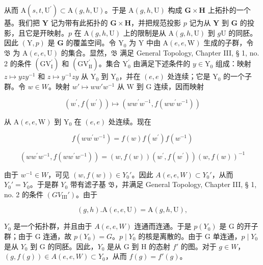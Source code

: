 从而 \(\mathrm{A}(s,t,\mathrm{U}^{\prime})\subset \mathrm{A}(g,h,\mathrm{U})\)。于是 \(\mathrm{A}(g,h,\mathrm{U})\) 构成 \(\mathbf{G}\times \mathbf{H}\) 上拓扑的一个基。我们把 \(\mathbf{Y}\) 记为带有此拓扑的 \(\mathbf{G}\times \mathbf{H}\)，并把规范投影 \(p\) 记为从 \(\mathbf{Y}\) 到 \(\mathbf{G}\) 的投影，且它是开映射。\(p\) 在 \(\mathrm{A}(g,h,\mathrm{U})\) 上的限制是从 \(\mathrm{A}(g,h,\mathrm{U})\) 到 \(g\mathrm{U}\) 的同胚。因此 \((\mathrm{Y},p)\) 是 \(\mathbf{G}\) 的覆盖空间。令 \(\mathrm{Y}_0\) 为 \(\mathrm{Y}\) 中由 \(\mathrm{A}(e,e,\mathrm{W})\) 生成的子群，令 \(\mathfrak{B}\) 为 \(\mathrm{A}(e,e,\mathrm{U})\) 的集合。显然，\(\mathfrak{B}\) 满足 General Topology, Chapter III, § 1, no. 2 的条件 \((\mathrm{GV}_{\mathrm{I}}^{\prime})\) 和 \((\mathrm{GV}_{\mathrm{II}}^{\prime})\)。集合 \(\mathrm{Y}_0^{\prime}\) 由满足下述条件的 \(y\in \mathrm{Y}_0\) 组成：映射 \(z\mapsto yzy^{-1}\) 和 \(z\mapsto y^{-1}zy\) 从 \(\mathrm{Y}_0\) 到 \(\mathrm{Y}_0\)，并在 \((e,e)\) 处连续；它是 \(\mathrm{Y}_0\) 的一个子群。令 \(w\in W\)。映射 \(w'\mapsto ww'w^{-1}\) 从 \(\mathrm{W}\) 到 \(\mathrm{G}\) 连续，因而映射

\[
\left(w ^ {\prime}, f \left(w ^ {\prime}\right)\right) \mapsto \left(w w ^ {\prime} w ^ {- 1}, f \left(w w ^ {\prime} w ^ {- 1}\right)\right)
\]

从 \(\mathrm{A}(e,e,\mathrm{W})\) 到 \(\mathrm{Y}_0\) 在 \((e,e)\) 处连续。现在

\[
f \left(w w ^ {\prime} w ^ {- 1}\right) = f (w) f \left(w ^ {\prime}\right) f \left(w ^ {- 1}\right)
\]

\[
\left(w w ^ {\prime} w ^ {- 1}, f \left(w w ^ {\prime} w ^ {- 1}\right)\right) = (w, f (w)) \left(w ^ {\prime}, f \left(w ^ {\prime}\right)\right) \left(w, f (w)\right) ^ {- 1}
\]

由于 \(w^{-1} \in W\)，可见 \((w, f(w)) \in Y_0'\)。因此 \(A(e, e, W) \subset Y_0'\)，从而 \(Y_0' = Y_0\)。于是群 \(Y_0\) 带有滤子基 \(\mathfrak{B}\)，并满足 General Topology, Chapter III, § 1, no. 2 的条件 \((GV_{\mathrm{III}}')\)。由于

\[
(g, h). \mathrm{A} (e, e, \mathrm{U}) = \mathrm{A} (g, h, \mathrm{U}),
\]

\(Y_{0}\) 是一个拓扑群，并且由于 \(A(e, e, W)\) 连通而连通。于是 \(p(Y_{0})\) 是 G 的开子群；由于 G 连通，故 \(p(Y_{0}) = G\)。\(p \mid Y_{0}\) 的核是离散的。由于 G 单连通，\(p \mid Y_{0}\) 是从 \(Y_{0}\) 到 G 的同胚。因此，\(Y_{0}\) 是从 G 到 H 的态射 \(f'\) 的图。对于 \(g \in W\)，\((g, f(g)) \in A(e, e, W) \subset Y_{0}\)，从而 \(f(g) = f'(g)\)。

